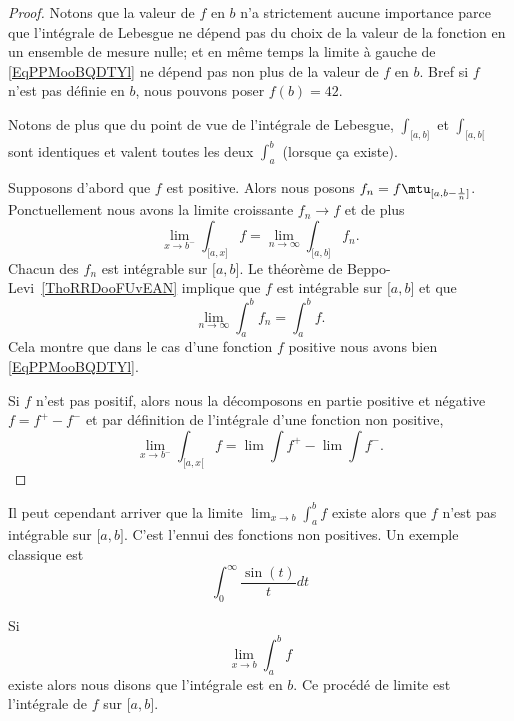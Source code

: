 \begin{proof}
	Notons que la valeur de \( f\) en \( b\) n'a strictement aucune importance parce que l'intégrale de Lebesgue ne dépend pas du choix de la valeur de la fonction en un ensemble de mesure nulle; et en même temps la limite à gauche de \eqref{EqPPMooBQDTYl} ne dépend pas non plus de la valeur de \( f\) en \( b\). Bref si \( f\) n'est pas définie en \( b\), nous pouvons poser \( f(b)=42\).

	Notons de plus que du point de vue de l'intégrale de Lebesgue, \( \int_{\mathopen[ a , b \mathclose]}\) et \( \int_{\mathopen[ a , b [}\) sont identiques et valent toutes les deux \( \int_a^b\) (lorsque ça existe).

	Supposons d'abord que \( f\) est positive. Alors nous posons \( f_n=f\mtu_{\mathopen[ a , b-\frac{1}{ n } \mathclose]}\). Ponctuellement nous avons la limite croissante \( f_n\to f\) et de plus
	\begin{equation}
		\lim_{x\to b^-} \int_{\mathopen[ a , x \mathclose]}f=\lim_{n\to \infty} \int_{\mathopen[ a , b \mathclose]}f_n.
	\end{equation}
	Chacun des \( f_n\) est intégrable sur \( \mathopen[ a , b \mathclose]\). Le théorème de Beppo-Levi~\ref{ThoRRDooFUvEAN} implique que \( f\) est intégrable sur \( \mathopen[ a , b \mathclose]\) et que
	\begin{equation}
		\lim_{n\to \infty} \int_a^bf_n=\int_a^bf.
	\end{equation}
	Cela montre que dans le cas d'une fonction \( f\) positive nous avons bien \eqref{EqPPMooBQDTYl}.

	Si \( f\) n'est pas positif, alors nous la décomposons en partie positive et négative \( f=f^+-f^{-}\) et par définition de l'intégrale d'une fonction non positive,
	\begin{equation}
		\lim_{x\to b^-} \int_{\mathopen[ a , x [}f=\lim\int f^{+}-\lim\int f^-.
	\end{equation}
\end{proof}

Il peut cependant arriver que la limite \( \lim_{x\to b} \int_a^bf\) existe alors que \( f\) n'est pas intégrable sur \( \mathopen[ a , b \mathclose]\). C'est l'ennui des fonctions non positives. Un exemple classique est
\begin{equation}\label{EqMMVooDSpgfz}
	\int_0^{\infty}\frac{ \sin(t) }{ t }dt
\end{equation}

\begin{definition}      \label{DEFooINPOooWWObEz}
	Si
	\begin{equation}
		\lim_{x\to b} \int_a^bf
	\end{equation}
	existe alors nous disons que l'intégrale est  en \( b\). Ce procédé de limite est l'intégrale  de \( f\) sur \( \mathopen[ a , b \mathclose]\).
\end{definition}

